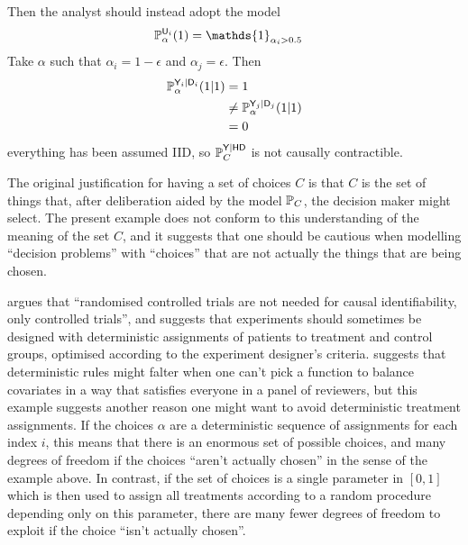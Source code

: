 Then the analyst should instead adopt the model
\begin{align}
    \prob{P}_\alpha^{\RV{U}_i}(1) &= \mathds{1}_{\alpha_i>0.5}
\end{align}
Take $\alpha$ such that $\alpha_i=1-\epsilon$ and $\alpha_j=\epsilon$. Then
\begin{align}
    \mathbb{P}_{\alpha}^{\mathsf{Y}_i|\mathsf{D}_i}(1|1) &= 1\\
    &\neq \mathbb{P}_\alpha^{\mathsf{Y}_j|\mathsf{D}_j}(1|1)\\
    &=0
\end{align}
everything has been assumed IID, so $\mathbb{P}_C^{\mathsf{Y}|\mathsf{HD}}$ is not causally contractible.

The original justification for having a set of choices $C$ is that $C$ is the set of things that, after deliberation aided by the model $\mathbb{P}_C$, the decision maker might select. The present example does not conform to this understanding of the meaning of the set $C$, and it suggests that one should be cautious when modelling ``decision problems'' with ``choices'' that are not actually the things that are being chosen.

\citet{kasy_why_2016} argues that ``randomised controlled trials are not needed for causal identifiability, only controlled trials'', and suggests that experiments should sometimes be designed with deterministic assignments of patients to treatment and control groups, optimised according to the experiment designer's criteria. \citet{banerjee_theory_2020} suggests that deterministic rules might falter when one can't pick a function to balance covariates in a way that satisfies everyone in a panel of reviewers, but this example suggests another reason one might want to avoid deterministic treatment assignments. If the choices $\alpha$ are a deterministic sequence of assignments for each index $i$, this means that there is an enormous set of possible choices, and many degrees of freedom if the choices ``aren't actually chosen'' in the sense of the example above. In contrast, if the set of choices is a single parameter in $[0,1]$ which is then used to assign all treatments according to a random procedure depending only on this parameter, there are many fewer degrees of freedom to exploit if the choice ``isn't actually chosen''.


